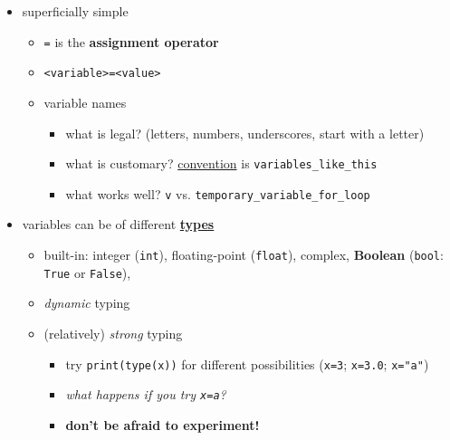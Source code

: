 \documentclass[]{tufte-handout}
\begin{document}
\begin{itemize}
\itemsep1pt\parskip0pt
\item
  superficially simple

  \begin{itemize}
  \itemsep1pt\parskip0pt
  \item
    \texttt{=} is the \textbf{assignment operator}
  \item
    \texttt{\textless{}variable\textgreater{}=\textless{}value\textgreater{}}
  \item
    variable names

    \begin{itemize}
    \itemsep1pt\parskip0pt
    \item
      what is legal? (letters, numbers, underscores, start with a
      letter)
    \item
      what is customary?
      \href{https://www.python.org/dev/peps/pep-0008/\#id30}{convention}
      is \texttt{variables\_like\_this}
    \item
      what works well? \texttt{v} vs.
      \texttt{temporary\_variable\_for\_loop}
    \end{itemize}
  \end{itemize}
\item
  variables can be of different
  \href{https://docs.python.org/3/library/stdtypes.html}{\textbf{types}}

  \begin{itemize}
  \itemsep1pt\parskip0pt
  \item
    built-in: integer (\texttt{int}), floating-point (\texttt{float}),
    complex, \textbf{Boolean} (\texttt{bool}: \texttt{True} or
    \texttt{False}),
  \item
    \emph{dynamic} typing
  \item
    (relatively) \emph{strong} typing

    \begin{itemize}
    \itemsep1pt\parskip0pt
    \item
      try \texttt{print(type(x))} for different possibilities
      (\texttt{x=3}; \texttt{x=3.0}; \texttt{x="a"})
    \item
      \emph{what happens if you try \texttt{x=a}?}
    \item
      \textbf{don't be afraid to experiment!}
    \end{itemize}
  \end{itemize}
\end{itemize}
\end{document}

